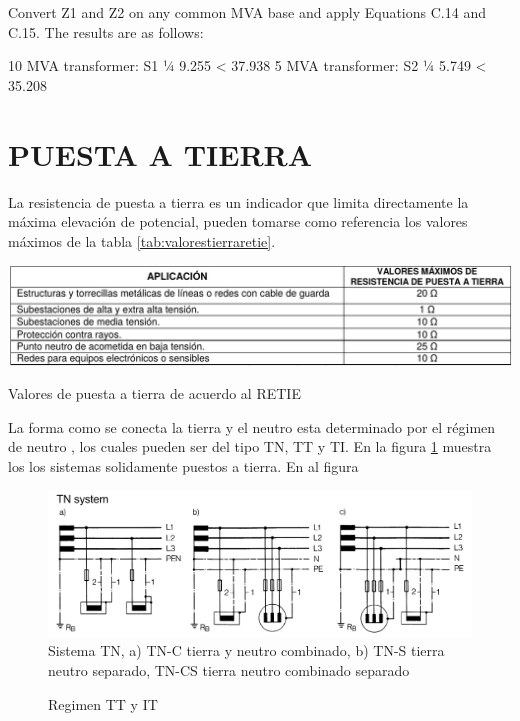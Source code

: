 \documentclass[a5paper]{book}%
\begin{document}
Convert Z1 and Z2 on any common MVA base and apply Equations C.14 and C.15. The results are as follows:

10 MVA transformer: S1 1⁄4 9.255 < 37.938
5 MVA transformer: S2 1⁄4 5.749 < 35.208

\section{PUESTA A TIERRA}

La resistencia de puesta a tierra es un indicador que limita directamente la
máxima elevación de potencial, pueden tomarse como referencia los valores máximos de la tabla \ref{tab:valorestierraretie}.

\begin{table}[H]
	\centering
	\includegraphics[width=0.7\linewidth]{valores_tierra_retie}
	\caption{Valores de puesta a tierra de acuerdo al RETIE \cite{RETIE2013}}
	\label{tab:valorestierraretie}
\end{table}

La forma como se conecta la tierra y el neutro esta determinado por el régimen de neutro , los cuales pueden ser del tipo TN, TT y TI. En la figura  \ref{fig:tnsystem} muestra los los sistemas  solidamente puestos a tierra. En al figura 

\begin{figure}[H]
	\centering
	\includegraphics[width=0.9\linewidth]{tnsystem}
	\caption{Sistema TN,  a) TN-C tierra y neutro combinado, b) TN-S tierra neutro separado, TN-CS tierra neutro combinado separado }
	\label{fig:tnsystem}
\end{figure}


\begin{figure}[H]
	\centering
	\caption{Regimen TT y IT}
	\label{fig:tttisystem}
\end{figure}
\end{document}
